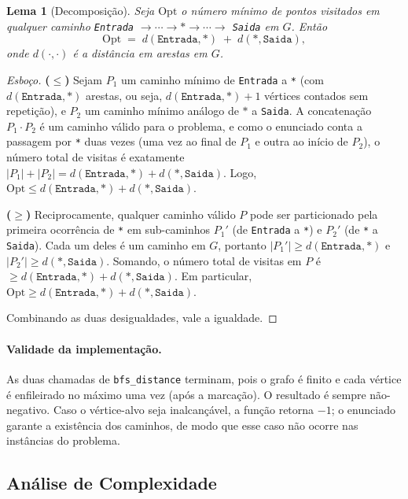 \documentclass[11pt,a4paper]{article}
\newtheorem{lemma}{Lema}
\begin{document}
\begin{lemma}[Decomposição]
\label{lem:decomp}
Seja $\mathrm{Opt}$ o número mínimo de pontos visitados em qualquer
caminho \texttt{Entrada} $\to \cdots \to *\to \cdots \to$ \texttt{Saida}
em $G$. Então
\[
    \mathrm{Opt} \;=\; d(\texttt{Entrada}, *) \;+\; d(*, \texttt{Saida}),
\]
onde $d(\cdot,\cdot)$ é a distância em arestas em $G$.
\end{lemma}

\begin{proof}[Esboço]
\textbf{($\le$)} Sejam $P_1$ um caminho mínimo de \texttt{Entrada} a
\texttt{*} (com $d(\texttt{Entrada},*)$ arestas, ou seja,
$d(\texttt{Entrada},*) + 1$ vértices contados sem repetição), e $P_2$
um caminho mínimo análogo de $*$ a \texttt{Saida}. A concatenação
$P_1 \cdot P_2$ é um caminho válido para o problema, e como o
enunciado conta a passagem por \texttt{*} duas vezes (uma vez ao final
de $P_1$ e outra ao início de $P_2$), o número total de visitas é
exatamente $|P_1| + |P_2| = d(\texttt{Entrada},*) + d(*,\texttt{Saida})$.
Logo, $\mathrm{Opt} \le d(\texttt{Entrada},*) + d(*,\texttt{Saida})$.

\textbf{($\ge$)} Reciprocamente, qualquer caminho válido $P$ pode ser
particionado pela primeira ocorrência de \texttt{*} em sub-caminhos
$P_1'$ (de \texttt{Entrada} a \texttt{*}) e $P_2'$ (de \texttt{*} a
\texttt{Saida}). Cada um deles é um caminho em $G$, portanto
$|P_1'| \ge d(\texttt{Entrada},*)$ e $|P_2'| \ge d(*,\texttt{Saida})$.
Somando, o número total de visitas em $P$ é
$\ge d(\texttt{Entrada},*) + d(*,\texttt{Saida})$. Em particular,
$\mathrm{Opt} \ge d(\texttt{Entrada},*) + d(*,\texttt{Saida})$.

Combinando as duas desigualdades, vale a igualdade.
\end{proof}

\paragraph{Validade da implementação.} As duas chamadas de
\texttt{bfs\_distance} terminam, pois o grafo é finito e cada vértice
é enfileirado no máximo uma vez (após a marcação). O resultado é
sempre não-negativo. Caso o vértice-alvo seja inalcançável, a função
retorna $-1$; o enunciado garante a existência dos caminhos, de modo
que esse caso não ocorre nas instâncias do problema.

\subsection{Análise de Complexidade}
\end{document}
